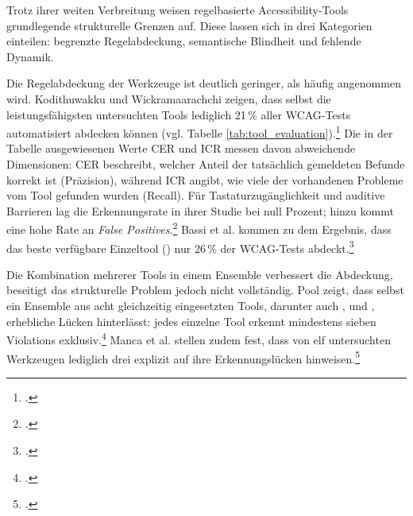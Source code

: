 Trotz ihrer weiten Verbreitung weisen regelbasierte Accessibility-Tools grundlegende strukturelle Grenzen auf. Diese lassen sich in drei Kategorien einteilen: begrenzte Regelabdeckung, semantische Blindheit und fehlende Dynamik.

Die Regelabdeckung der Werkzeuge ist deutlich geringer, als häufig angenommen wird. \mbox{Kodithuwakku} und \mbox{Wickramaarachchi} zeigen, dass selbst die leistungsfähigsten untersuchten Tools lediglich 21\,\% aller \ac{WCAG}-Tests automatisiert abdecken können (vgl. Tabelle \ref{tab:tool_evaluation}).\footcite[Vgl.][]{kodithuwakku_assessing_2025} Die in der Tabelle ausgewiesenen Werte CER und ICR messen davon abweichende Dimensionen: CER beschreibt, welcher Anteil der tatsächlich gemeldeten Befunde korrekt ist (Präzision), während ICR angibt, wie viele der vorhandenen Probleme vom Tool gefunden wurden (Recall). Für Tastaturzugänglichkeit und auditive Barrieren lag die Erkennungsrate in ihrer Studie bei null Prozent; hinzu kommt eine hohe Rate an \textit{False Positives}.\footcite[Vgl.][]{kodithuwakku_assessing_2025} Bassi et al. kommen zu dem Ergebnis, dass das beste verfügbare Einzeltool () nur 26\,\% der \ac{WCAG}-Tests abdeckt.\footcite[Vgl.][S. 298]{bassi_assessment_2025}

\enlargethispage{\baselineskip}
Die Kombination mehrerer Tools in einem Ensemble verbessert die Abdeckung, beseitigt das strukturelle Problem jedoch nicht vollständig. Pool zeigt, dass selbst ein Ensemble aus acht gleichzeitig eingesetzten Tools, darunter auch ,  und , erhebliche Lücken hinterlässt: jedes einzelne Tool erkennt mindestens sieben Violations exklusiv.\footcite[Vgl.][]{pool_testaro_2023} \mbox{Manca} et al. stellen zudem fest, dass von elf untersuchten Werkzeugen lediglich drei explizit auf ihre Erkennungs\-lücken hinweisen.\footcite[Vgl.][S. 4]{manca_transparency_2023}


